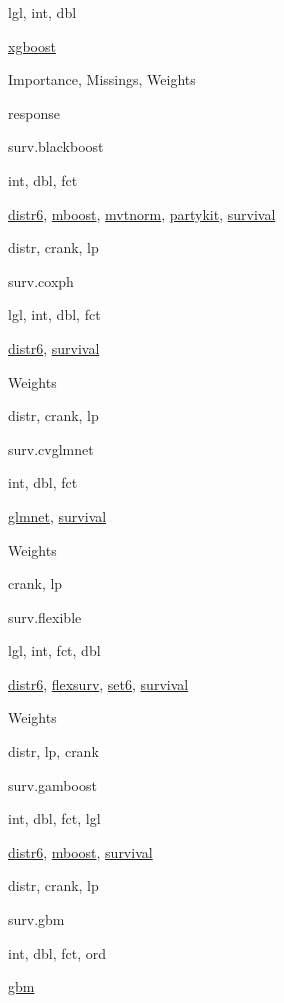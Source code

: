 \documentclass[]{article}
\begin{document}
lgl, int, dbl

\href{https://cran.r-project.org/package=xgboost}{xgboost}

Importance, Missings, Weights

response

surv.blackboost

int, dbl, fct

\href{https://cran.r-project.org/package=distr6}{distr6}, \href{https://cran.r-project.org/package=mboost}{mboost}, \href{https://cran.r-project.org/package=mvtnorm}{mvtnorm}, \href{https://cran.r-project.org/package=partykit}{partykit}, \href{https://cran.r-project.org/package=survival}{survival}

distr, crank, lp

surv.coxph

lgl, int, dbl, fct

\href{https://cran.r-project.org/package=distr6}{distr6}, \href{https://cran.r-project.org/package=survival}{survival}

Weights

distr, crank, lp

surv.cvglmnet

int, dbl, fct

\href{https://cran.r-project.org/package=glmnet}{glmnet}, \href{https://cran.r-project.org/package=survival}{survival}

Weights

crank, lp

surv.flexible

lgl, int, fct, dbl

\href{https://cran.r-project.org/package=distr6}{distr6}, \href{https://cran.r-project.org/package=flexsurv}{flexsurv}, \href{https://cran.r-project.org/package=set6}{set6}, \href{https://cran.r-project.org/package=survival}{survival}

Weights

distr, lp, crank

surv.gamboost

int, dbl, fct, lgl

\href{https://cran.r-project.org/package=distr6}{distr6}, \href{https://cran.r-project.org/package=mboost}{mboost}, \href{https://cran.r-project.org/package=survival}{survival}

distr, crank, lp

surv.gbm

int, dbl, fct, ord

\href{https://cran.r-project.org/package=gbm}{gbm}
\end{document}
